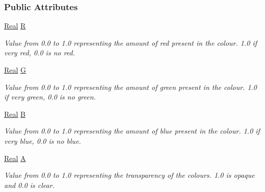\subsubsection*{Public Attributes}
\begin{DoxyCompactItemize}
\item 
\hypertarget{classphys_1_1ColourValue_aeea3df8afd8e270053c139d55b3acc9f}{
\hyperlink{namespacephys_af7eb897198d265b8e868f45240230d5f}{Real} \hyperlink{classphys_1_1ColourValue_aeea3df8afd8e270053c139d55b3acc9f}{R}}
\label{classphys_1_1ColourValue_aeea3df8afd8e270053c139d55b3acc9f}

\begin{DoxyCompactList}\small\item\em Value from 0.0 to 1.0 representing the amount of red present in the colour. 1.0 if very red, 0.0 is no red. \item\end{DoxyCompactList}\item 
\hypertarget{classphys_1_1ColourValue_a090f0e8f08c52722fbfc8f040436fa7a}{
\hyperlink{namespacephys_af7eb897198d265b8e868f45240230d5f}{Real} \hyperlink{classphys_1_1ColourValue_a090f0e8f08c52722fbfc8f040436fa7a}{G}}
\label{classphys_1_1ColourValue_a090f0e8f08c52722fbfc8f040436fa7a}

\begin{DoxyCompactList}\small\item\em Value from 0.0 to 1.0 representing the amount of green present in the colour. 1.0 if very green, 0.0 is no green. \item\end{DoxyCompactList}\item 
\hypertarget{classphys_1_1ColourValue_af206831fc141ebf36e8d3b8d53663701}{
\hyperlink{namespacephys_af7eb897198d265b8e868f45240230d5f}{Real} \hyperlink{classphys_1_1ColourValue_af206831fc141ebf36e8d3b8d53663701}{B}}
\label{classphys_1_1ColourValue_af206831fc141ebf36e8d3b8d53663701}

\begin{DoxyCompactList}\small\item\em Value from 0.0 to 1.0 representing the amount of blue present in the colour. 1.0 if very blue, 0.0 is no blue. \item\end{DoxyCompactList}\item 
\hypertarget{classphys_1_1ColourValue_ae7bfb3493f467b07e2d2796b8812b317}{
\hyperlink{namespacephys_af7eb897198d265b8e868f45240230d5f}{Real} \hyperlink{classphys_1_1ColourValue_ae7bfb3493f467b07e2d2796b8812b317}{A}}
\label{classphys_1_1ColourValue_ae7bfb3493f467b07e2d2796b8812b317}

\begin{DoxyCompactList}\small\item\em Value from 0.0 to 1.0 representing the transparency of the colours. 1.0 is opaque and 0.0 is clear. \item\end{DoxyCompactList}\end{DoxyCompactItemize}


